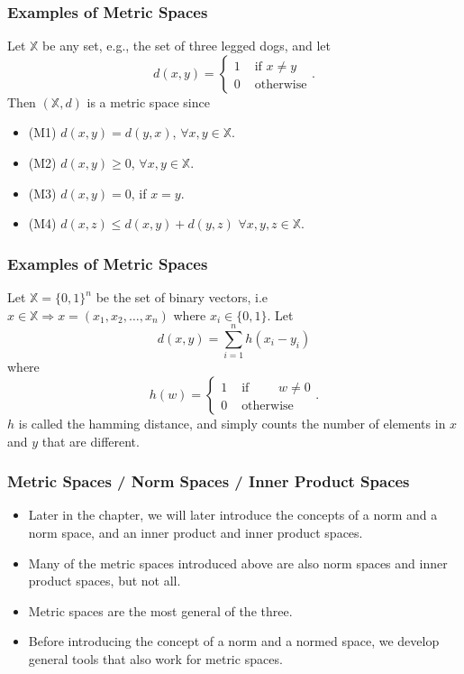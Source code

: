 \documentclass{beamer}
\begin{document}
\begin{frame}\frametitle{Examples of Metric Spaces}

\begin{example}

Let $\mathbb{X}$ be any set, e.g., the set of three legged dogs, and let
\[
d(x,y) = \begin{cases}
 1 & \text{~if~} x\neq y \\
 0 & \text{~otherwise}	
 \end{cases}.
 \]
 Then $(\mathbb{X}, d)$ is a metric space since
\begin{itemize}
	\item (M1) $d(x,y) = d(y,x)$, $\forall x,y \in \mathbb{X}$.
	\item (M2) $d(x,y) \geq 0$, $\forall x,y \in \mathbb{X}$.	
	\item (M3) $d(x,y) = 0$, if $x=y$.	
	\item (M4) $d(x,z)\leq d(x,y) + d(y,z)$ $\forall x,y,z \in \mathbb{X}$. 
\end{itemize}
\end{example}
\end{frame}

\begin{frame}\frametitle{Examples of Metric Spaces}

\begin{example}

Let $\mathbb{X}=\{0,1\}^n$ be the set of binary vectors, i.e \\
$x\in\mathbb{X} \Rightarrow x=(x_1, x_2, \dots, x_n)$ where $x_i\in \{0, 1\}$.
Let 
\[ 
d(x,y) = \sum_{i=1}^{n}{h(x_i - y_i)} 
\]  
where
\[ 
h(w) = \begin{cases} 
	1 & \text{ if } \qquad w \neq 0 \\ 
	0 & \text{ otherwise }
\end{cases}.
\]
$h$ is called the hamming distance, and simply counts the number of elements in $x$ and $y$ that are different.
\end{example}
\end{frame}

\begin{frame}\frametitle{Metric Spaces / Norm Spaces / Inner Product Spaces}

\begin{itemize}
\item Later in the chapter, 	we will later introduce the concepts of a norm and a norm space, and an inner product and inner product spaces.
\item Many of the metric spaces introduced above are also norm spaces and inner product spaces, but not all.  
\item Metric spaces are the most general of the three.  
\item Before introducing the concept of a norm and a normed space, we develop general tools that also work for metric spaces.
\end{itemize}
\end{frame}
\end{document}

